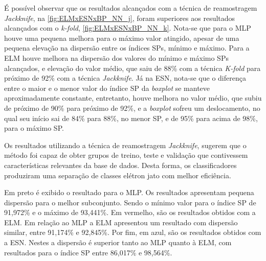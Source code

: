 É possível observar que os resultados alcançados com a técnica de reamostragem \textit{Jackknife}, na \autoref{fig:ELMxESNxBP_NN_j}, foram superiores aos resultados alcançados com o \textit{k-fold}, \autoref{fig:ELMxESNxBP_NN_k}. Nota-se que para o MLP houve uma pequena melhora para o máximo valor atingido, apesar de uma pequena elevação na dispersão entre os índices SPs, mínimo e máximo. Para a ELM houve melhora na dispersão dos valores do mínimo e máximo SPs alcançados, e elevação do valor médio, que saiu de 88\% com a técnica \textit{K-fold} para próximo de 92\% com a técnica \textit{Jackknife}. Já na ESN, nota-se que o diferença entre o maior e o menor valor do índice SP da \textit{boxplot} se manteve aproximadamente constante, entretanto, houve melhora no valor médio, que subiu de próximo de 90\% para próximo de 92\%, e a \textit{boxplot} sofreu um deslocamento, no qual seu início sai de 84\% para 88\%, no menor SP, e de 95\% para acima de 98\%, para o máximo SP.

Os resultados utilizando a técnica de reamostragem \textit{Jackknife}, sugerem que o método foi capaz de obter grupos de treino, teste e validação que contivessem características relevantes da base de dados. Desta forma, os classificadores produziram uma separação de classes elétron jato com melhor eficiência.

Em preto é exibido o resultado para o MLP. Os resultados apresentam pequena dispersão para o melhor subconjunto. Sendo o mínimo valor para o índice SP de 91,972\% e o máximo de  93,441\%. Em vermelho, são os resultados obtidos com a ELM. Em relação ao MLP a ELM apresentou um resultado com dispersão similar, entre 91,174\% e 92,845\%. Por fim, em azul, são os resultados obtidos com a ESN. Nestes a dispersão é superior tanto ao MLP quanto à ELM, com resultados para o índice SP entre 86,017\% e 98,564\%.





